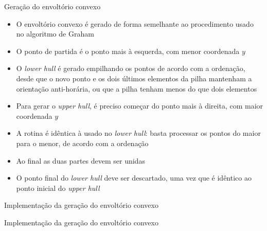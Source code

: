 \begin{frame}[fragile]{Geração do envoltório convexo}

    \begin{itemize}
        \item O envoltório convexo é gerado de forma semelhante ao procedimento usado no 
            algoritmo de Graham

        \item O ponto de partida é o ponto mais à esquerda, com menor coordenada $y$

        \item O \textit{lower hull} é gerado empilhando os pontos de acordo com a ordenação,
            desde que o novo ponto e os dois últimos elementos da pilha mantenham a orientação 
            anti-horária, ou que a pilha tenham menos do que dois elementos

        \item Para gerar o \textit{upper hull}, é preciso começar do ponto mais à direita, com
            maior coordenada $y$

        \item A rotina é idêntica à usado no \textit{lower hull}: basta processar os pontos
            do maior para o menor, de acordo com a ordenação

        \item Ao final as duas partes devem ser unidas

        \item O ponto final do \textit{lower hull} deve ser descartado, uma vez que é idêntico
            ao ponto inicial do \textit{upper hull} 

    \end{itemize}

\end{frame}



\begin{frame}[fragile]{Implementação da geração do envoltório convexo}
\end{frame}

\begin{frame}[fragile]{Implementação da geração do envoltório convexo}
\end{frame}




